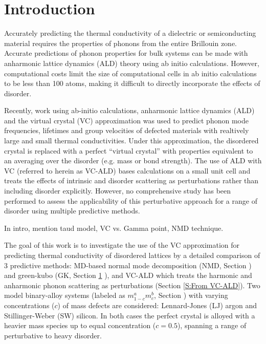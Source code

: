 \documentclass[aps,prb,onecolumn,preprint,superscriptaddress,amsmath,amssymb,floatfix]{revtex4}
\begin{document}
\section{\label{S:Introduction}Introduction}

Accurately predicting the thermal conductivity of a dielectric or 
semiconducting material requires the properties of phonons from the entire 
Brillouin zone. Accurate predictions of phonon properties for bulk systems 
can be made with anharmonic lattice dynamics (ALD) theory 
using ab initio 
calculations.\cite{ward_intrinsic_2010,lindsay_thermal_2012,
garg_role_2011,
shiga_microscopic_2012,tian_phonon_2012,
shiomi_thermal_2011,esfarjani_heat_2011}
However, computational costs limit the size of computational cells 
in ab initio calculations to be less than 100 atoms, making it difficult 
to directly incorporate the effects of disorder.
\cite{koker_thermal_2009,bao_first-principles_2012,
lindsay_thermal_2012,tian_phonon_2012,garg_role_2011}

Recently, work using ab-initio calculations, anharmonic 
lattice dynamics (ALD) and the virtual crystal (VC) 
approximation was used to predict phonon mode frequencies, lifetimes and 
group velocities of defected materials with realtively
large\cite{garg_role_2011,lindsay_thermal_2012} 
and 
small\cite{tian_phonon_2012} 
thermal conductivities. 
Under this approximation, the disordered 
crystal is replaced with a perfect “virtual crystal” with properties 
equivalent to an averaging over the disorder (e.g.  mass or bond 
strength).\cite{abeles_lattice_1963}
The use of ALD with VC (referred to herein as VC-ALD) bases 
calculations on a small unit cell and 
treats the effects of intrinsic and disorder scattering as perturbations 
rather than including disorder explicitly.
\cite{abeles_lattice_1963,tamura_isotope_1983,tian_phonon_2012} 
However, no comprehensive study has been performed 
to assess the applicability of this perturbative approach for a range 
of disorder using multiple predictive methods.

In intro, mention taud model, VC vs. Gamma point, NMD technique.

The goal of this work is to investigate the use of the VC 
approximation for predicting thermal conductivity of disordered 
lattices by a detailed comparison 
of 3 predictive methods: MD-based normal mode 
decomposition (NMD, Section ) and green-kubo (GK, Section \ref{} ), 
and VC-ALD which treats the harmonic and 
anharmonic phonon scattering as perturbations 
(Section \ref{S:From VC-ALD}). 
Two model binary-alloy systems 
(labeled as $m^a_{1-c}m^b_{c}$, Section ) 
with varying concentrations ($c$) of mass defects  
are considered: 
Lennard-Jones (LJ) argon and Stillinger-Weber (SW) silicon. 
In both cases the perfect crystal is 
alloyed with a heavier mass species up to equal 
concentration ($c=0.5$), spanning 
a range of perturbative to heavy disorder. 
\end{document}
